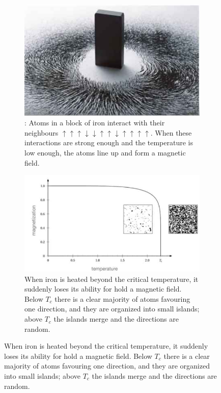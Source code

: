 \documentclass[]{article}
\begin{document}
\begin{figure}[H]
	\begin{center}
		\caption{Ising Model}
		\begin{subfigure}[t]{0.35\textwidth}
			\caption{: Atoms in a block of iron interact with their neighbours $\uparrow\uparrow\uparrow\downarrow\downarrow\uparrow\uparrow\downarrow\uparrow\uparrow\uparrow\uparrow$. When these interactions are strong enough and the temperature is low enough, the atoms line up and form a magnetic field.}
			\includegraphics[width=\textwidth]{permanent-magnet}
		\end{subfigure}
		\;\;\;
		\begin{subfigure}[t]{0.6\textwidth}
			\caption{When iron is heated beyond the critical temperature, it suddenly loses its ability for hold a magnetic field. Below $T_c$ there is a clear majority of atoms favouring one direction, and they are organized into small islands; above $T_c$ the islands merge and the directions are random.}
			\includegraphics[width=\textwidth]{curie-temperature}
		\end{subfigure}
	\end{center}
\end{figure}
\end{document}
